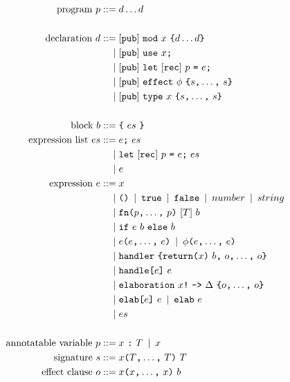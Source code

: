 \begin{figure}[p]
\begin{align*}
    \text{program}\ p
        \IS & d \dots d\\
    \\
    \text{declaration}\ d
        \IS & \opt{\tok{pub}}\ \tok{mod}\ x\ \tok{\{} \rep{d} \tok{\}}\\
        \OR & \opt{\tok{pub}}\ \tok{use}\ x\tok{;}\\
        \OR & \opt{\tok{pub}}\ \tok{let}\ \opt{\tok{rec}}\ p\ \tok{=}\ e\tok{;}\\
        \OR & \opt{\tok{pub}}\ \tok{effect}\ \phi\ \tok{\{} \csep{s} \tok{\}}\\
        \OR & \opt{\tok{pub}}\ \tok{type}\ x\ \tok{\{} \csep{s} \tok{\}}\\
    \\
    \text{block}\ b
        \IS & \tok{\{}\ es\ \tok{\}}\\
    \text{expression list}\ es
        \IS & e\tok{;}\ es\\
        \OR & \tok{let}\ \opt{\tok{rec}}\ p\ \tok{=}\ e\tok{;}\ es\\
        \OR & e\\
    \text{expression}\ e
        \IS & x\\
        \OR & \tok{()} \OR \tok{true} \OR \tok{false} \OR number \OR string \\
        \OR & \tok{fn} \tok{(} \csep{p} \kw{)}\ [T]\ b \\
        \OR & \tok{if}\ e\ b\ \tok{else}\ b\\
        \OR & e\tok{(} \csep{e} \tok{)} \OR \phi\tok{(} \csep{e} \tok{)} \\
        \OR & \tok{handler}\ \tok{\{} \tok{return} \tok{(}x\tok{)}\ b \tok{,}\ \csep{o} \tok{\}}\\
        \OR & \tok{handle}\tok{[}e\tok{]}\ e \\
        \OR & \tok{elaboration}\ x\tok{!}\ \tok{->}\ \Delta\ \tok{\{} \csep{o} \tok{\}}\\
        \OR & \tok{elab}\tok{[} e \tok{]}\ e \OR \tok{elab}\ e \\
        \OR & es\\
    \\
    \text{annotatable variable}\ p
        \IS & x\ \tok{:}\ T \OR x\\
    \text{signature}\ s
        \IS & x \tok{(} \csep{T} \tok{)}\ T\\
    \text{effect clause}\ o
        \IS & x \tok{(} \csep{x} \tok{)}\ b\\

\end{align*}
\end{figure}
